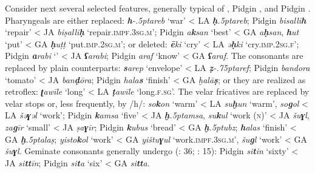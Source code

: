 \documentclass[output=paper]{langsci/langscibook}
\begin{document}
Consider next several selected features, generally typical of ,  Pidgin , and  Pidgin .  Pharyngeals are either replaced:  \textit{\textbf{h}\kern -.5ptareb} ‘war’ < LA \textit{\textbf{ḥ}\kern .5ptareb};  Pidgin  \textit{bisalli\textbf{h}} ‘repair’ < JA \textit{biṣalli\textbf{ḥ}} ‘repair.\textsc{impf}.\textsc{3sg.m}’;  Pidgin  \textit{a\textbf{k}san} ‘best’ < GA \textit{a\textbf{ḥ}san}, \textit{\textbf{h}ut} ‘put’ < GA \textit{\textbf{ḥ}uṭṭ} ‘put.\textsc{imp.2sg.m}’; or deleted:  \textit{\textbf{ē}ki} ‘cry’ < LA \textit{ə\textbf{ḥ}ki} ‘cry.\textsc{imp}.2\textsc{sg}.\textsc{f}’;  Pidgin  \textit{\textbf{a}rabi} ‘’ < JA \textit{\textbf{ʕ}arabi};  Pidgin  \textit{araf} ‘know’ < GA \textit{\textbf{ʕ}araf}. The  consonants are replaced by plain counterparts:   \textit{\textbf{s}arep} ‘envelope’ < LA \textit{\textbf{ẓ}\kern -.75ptaref};  Pidgin  \textit{bandora} ‘tomato’ < JA \textit{ban\textbf{ḍ}ōra};  Pidgin  \textit{hala\textbf{s}} `finish' < GA \textit{ḫalā\textbf{ṣ}}; or they are realized as retroflex:  \textit{\textbf{ʈ}awīle} ‘long’ < LA \textit{\textbf{ṭ}awīle} ‘long.\textsc{f}.\textsc{sg}’. The velar fricatives are replaced by velar stops or, less frequently, by /h/:  \textit{so\textbf{k}on} ‘warm’ < LA \textit{su\textbf{ḫ}un} ‘warm’, \textit{so\textbf{g}ol} < LA \textit{šə\textbf{ɣ}əl} ‘work’;  Pidgin  \textit{\textbf{k}amsa} ‘five’ < JA \textit{\textbf{ḫ}\kern .5ptamsa}, \textit{su\textbf{k}ul} ‘work (\textsc{n})’ < JA \textit{šu\textbf{ɣ}l}, \textit{za\textbf{g}īr} ‘small’ < JA \textit{ṣa\textbf{ɣ}īr};  Pidgin  \textit{\textbf{k}ubus} ‘bread’ < GA \textit{\textbf{ḫ}\kern .5ptubz}; \textit{\textbf{h}alas} ‘finish’ < GA \textit{\textbf{ḫ}\kern .5ptalaṣ}; \textit{yisto\textbf{k}ol} ‘work’ < GA \textit{yištu\textbf{ɣ}ul} ‘work.\textsc{impf.3sg.m}’, \textit{šu\textbf{g}l} ‘work’ < GA \textit{šu\textbf{ɣ}l}. Geminate consonants generally undergo  (\citealt{Næss2008}: 36; \citealt{Avram2014Pidgin}: 15):  Pidgin  \textit{si\textbf{t}in} ‘sixty’ < JA \textit{si\textbf{tt}īn};  Pidgin  \textit{si\textbf{t}a} ‘six’ < GA \textit{si\textbf{tt}a}.
\end{document}
